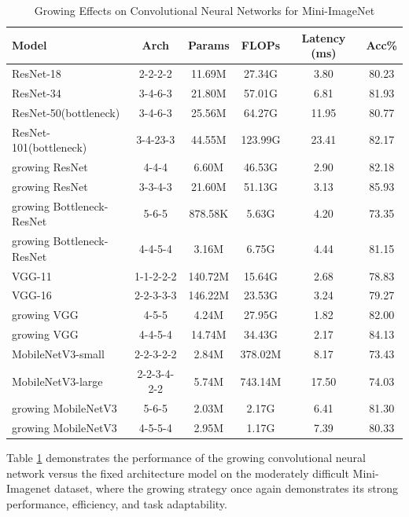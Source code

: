 \documentclass[preprint,12pt]{elsarticle}
\begin{document}
\begin{table}[ht]
\centering
\tiny
\renewcommand{\arraystretch}{1.3}
\begin{adjustbox}{center}
\begin{tabular}{lccccc}
\hline
\textbf{Model} & \textbf{Arch} & \textbf{Params} & \textbf{FLOPs} & \textbf{Latency (ms)} & \textbf{Acc\%} \\
\hline
ResNet-18 & 2-2-2-2 & 11.69M & 27.34G & 3.80 & 80.23 \\
ResNet-34 & 3-4-6-3 & 21.80M & 57.01G & 6.81 & 81.93 \\
ResNet-50(bottleneck) & 3-4-6-3 & 25.56M & 64.27G & 11.95 & 80.77 \\
ResNet-101(bottleneck) & 3-4-23-3 & 44.55M & 123.99G & 23.41 & 82.17 \\
growing ResNet & 4-4-4 & 6.60M & 46.53G & 2.90 & 82.18 \\
growing ResNet & 3-3-4-3 & 21.60M & 51.13G & 3.13 & 85.93 \\
growing Bottleneck-ResNet & 5-6-5 & 878.58K & 5.63G & 4.20 & 73.35 \\
growing Bottleneck-ResNet & 4-4-5-4 & 3.16M & 6.75G & 4.44 & 81.15 \\ \hline
VGG-11 & 1-1-2-2-2 & 140.72M & 15.64G & 2.68 & 78.83 \\
VGG-16 & 2-2-3-3-3 & 146.22M & 23.53G & 3.24 & 79.27 \\
growing VGG & 4-5-5 & 4.24M & 27.95G & 1.82 & 82.00 \\
growing VGG & 4-4-5-4 & 14.74M & 34.43G & 2.17 & 84.13 \\ \hline
MobileNetV3-small & 2-2-3-2-2 & 2.84M & 378.02M & 8.17 & 73.43 \\
MobileNetV3-large & 2-2-3-4-2-2 & 5.74M & 743.14M & 17.50 & 74.03 \\
growing MobileNetV3 & 5-6-5 & 2.03M & 2.17G & 6.41 & 81.30 \\
growing MobileNetV3 & 4-5-5-4 & 2.95M & 1.17G & 7.39 & 80.33 \\
\hline
\end{tabular}
\end{adjustbox}
\caption{Growing Effects on Convolutional Neural Networks for Mini-ImageNet}
\label{table:miniimagenet_self_growth}
\end{table}

Table \ref{table:miniimagenet_self_growth} demonstrates the performance of the growing convolutional neural network versus the fixed architecture model on the moderately difficult Mini-Imagenet dataset, where the growing strategy once again demonstrates its strong performance, efficiency, and task adaptability.
\end{document}
